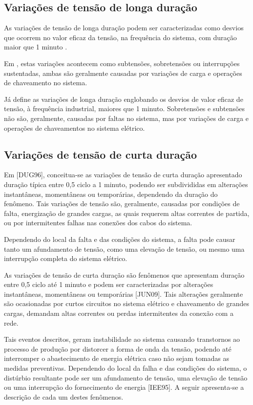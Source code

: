 \subsection{Variações de tensão de longa duração}
\par
As variações de tensão de longa duração podem ser caracterizadas como desvios que ocorrem no valor eficaz da tensão, na frequência do sistema, com duração maior que 1 minuto \cite{DUG96}.
\par 
Em \cite{DEL03}, estas variações acontecem como subtensões, sobretensões ou interrupções sustentadas, ambas são geralmente causadas por variações de carga e operações de chaveamento no sistema.
\par 
Já \cite{FER99} define as variações de longa duração englobando os desvios de valor eficaz de tensão, à frequência industrial, maiores que 1 minuto. Sobretensões e subtensões não são, geralmente, causadas por faltas no sistema, mas por variações de carga e operações de chaveamentos no sistema elétrico.

\subsection{Variações de tensão de curta duração}
\par 
Em [DUG96], conceitua-se as variações de tensão de curta duração apresentado duração típica entre 0,5 ciclo a 1 minuto, podendo ser subdivididas em alterações instantâneas, momentâneas ou temporárias, dependendo da duração do fenômeno. Tais variações de tensão são, geralmente, causadas por condições de falta, energização de grandes cargas, as quais requerem altas correntes de partida, ou por intermitentes falhas nas conexões dos cabos do sistema. 
\par 
Dependendo do local da falta e das condições do sistema, a falta pode causar tanto um afundamento de tensão, como uma elevação de tensão, ou mesmo uma interrupção completa do sistema elétrico.
\par 
As variações de tensão de curta duração são fenômenos que apresentam duração entre 0,5 ciclo até 1 minuto e podem ser caracterizadas por alterações instantâneas, momentâneas ou temporárias [JUN09]. Tais alterações geralmente são ocasionadas por curtos circuitos no sistema elétrico e chaveamento de grandes cargas, demandam altas correntes ou perdas intermitentes da conexão com a rede. 
\par 
Tais eventos descritos, geram instabilidade ao sistema causando transtornos ao processo de produção por distorcer a forma de onda da tensão, podendo até interromper o abastecimento de energia elétrica caso não sejam tomadas as medidas preventivas. Dependendo do local da falha e das condições do sistema, o distúrbio resultante pode ser um afundamento de tensão, uma elevação de tensão ou uma interrupção do fornecimento de energia [IEE95]. A seguir apresenta-se a descrição de cada um destes fenômenos.

